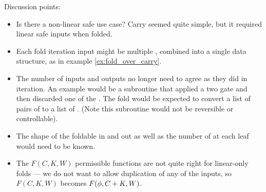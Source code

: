 Discussion points:
\begin{itemize}
  \item Is there a non-linear safe use case? Carry seemed quite simple,
    but it required linear safe inputs when folded.
  \item Each fold iteration input might be multiple ,
  combined into a single data structure, as in example
    \vref{ex:fold_over_carry}.
  \item The number of inputs and outputs no longer need
    to agree as they did in iteration.  An example would be a subroutine that
    applied a two \qubit gate and then discarded one of the \qubits.
    The fold would be expected to convert a list of pairs  of 
    to a list of . (Note this subroutine would not be reversible
    or controllable).
  \item The shape of the foldable in and out as well as the number of \qubits
    at each leaf would need to be known.
  \item The $F(C,K,W)$ permissible functions are not quite right for
    linear-only folds --- we do not want to allow duplication of any of
    the inputs, so $F(C,K,W)$ becomes $F(\phi,C+K,W)$.
\end{itemize}

